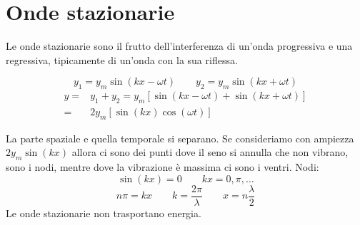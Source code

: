 \section{Onde stazionarie}
Le onde stazionarie sono il frutto dell'interferenza di un'onda progressiva e una regressiva, tipicamente di un'onda con la sua riflessa.

\parbox[]{\textwidth}{
   \[
      y_1=y_m\sin\left(kx-\omega t\right)\qquad y_2=y_m\sin\left(kx+\omega t\right)
   \]
   \begin{align*}
      y= & y_1+y_2=y_m\left[\sin\left(kx-\omega t\right)+\sin\left(kx+\omega t\right)\right] \\
      =  & 2y_m\left[\sin\left(kx\right)\cos\left(\omega t\right)\right]
   \end{align*}
}
La parte spaziale e quella temporale si separano. Se consideriamo con ampiezza $2y_m\sin\left(kx\right)$ allora ci sono dei punti dove il seno si annulla che non vibrano, sono i nodi, mentre dove la vibrazione è massima ci sono i ventri. Nodi:
\[\sin\left(kx\right)=0\qquad kx=0,\pi,\ldots\]
\[n\pi=kx\qquad k=\frac{2\pi}{\lambda}\qquad x=n\frac{\lambda}{2}\]
Le onde stazionarie non trasportano energia.

